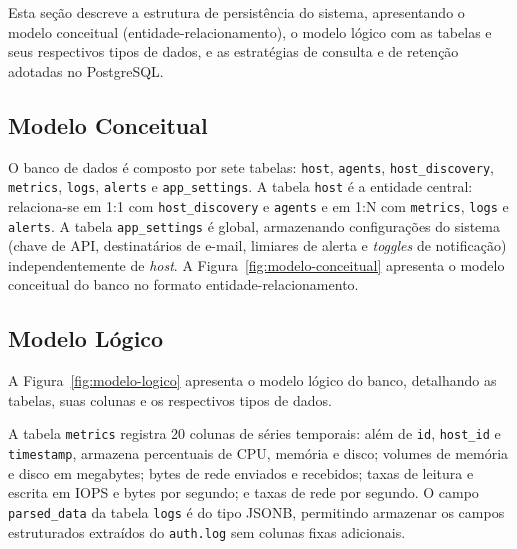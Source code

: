 \documentclass[
    12pt
    ,oneside
    ,a4paper
    ,chapter=TITLE
    ,section=TITLE
    ,sumario=abnt-6027-2012]{abntex2}
\begin{document}
Esta seção descreve a estrutura de persistência do sistema, apresentando o modelo conceitual (entidade-relacionamento), o modelo lógico com as tabelas e seus respectivos tipos de dados, e as estratégias de consulta e de retenção adotadas no PostgreSQL.

\subsection{Modelo Conceitual}
\label{subsec:modelo-conceitual}

O banco de dados é composto por sete tabelas: \texttt{host}, \texttt{agents},
\texttt{host\_discovery}, \texttt{metrics}, \texttt{logs}, \texttt{alerts} e
\texttt{app\_settings}. A tabela \texttt{host} é a entidade central: relaciona-se em
1:1 com \texttt{host\_discovery} e \texttt{agents} e em 1:N com \texttt{metrics},
\texttt{logs} e \texttt{alerts}. A tabela \texttt{app\_settings} é global, armazenando
configurações do sistema (chave de API, destinatários de e-mail, limiares de alerta e
\textit{toggles} de notificação) independentemente de \textit{host}. A
Figura~\ref{fig:modelo-conceitual} apresenta o modelo conceitual do banco no formato
entidade-relacionamento.

\begin{figure}[H]
\end{figure}

\subsection{Modelo Lógico}
\label{subsec:modelo-logico}

A Figura~\ref{fig:modelo-logico} apresenta o modelo lógico do banco, detalhando as
tabelas, suas colunas e os respectivos tipos de dados.

\begin{figure}[H]
\end{figure}

A tabela \texttt{metrics} registra 20 colunas de séries temporais: além de
\texttt{id}, \texttt{host\_id} e \texttt{timestamp}, armazena percentuais de CPU,
memória e disco; volumes de memória e disco em megabytes; bytes de rede enviados e
recebidos; taxas de leitura e escrita em IOPS e bytes por segundo; e taxas de rede
por segundo. O campo \texttt{parsed\_data} da tabela \texttt{logs} é do tipo JSONB,
permitindo armazenar os campos estruturados extraídos do \texttt{auth.log} sem
colunas fixas adicionais.
\end{document}
